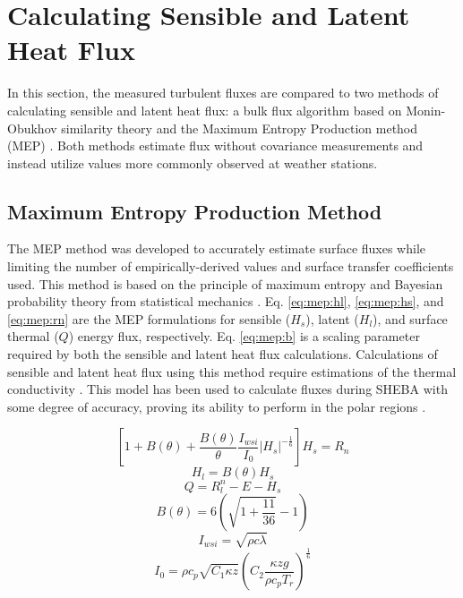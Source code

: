 \section{Calculating Sensible and Latent Heat Flux}
In this section, the measured turbulent fluxes are compared to two methods of calculating sensible and latent heat flux: a bulk flux algorithm based on Monin-Obukhov similarity theory \citep{foken:2008} and the Maximum Entropy Production method (MEP) \citep{zhang:2021, wang:2014, wang:2009}. Both methods estimate flux without covariance measurements and instead utilize values more commonly observed at weather stations.

\subsection{Maximum Entropy Production Method} 
The MEP method was developed to accurately estimate surface fluxes while limiting the number of empirically-derived values and surface transfer coefficients used. This method is based on the principle of maximum entropy and Bayesian probability theory from statistical mechanics \citep{dewar:2004, wang:2014}. Eq. \ref{eq:mep:hl}, \ref{eq:mep:hs}, and \ref{eq:mep:rn} are the MEP formulations for sensible ($H_{s}$), latent ($H_{l}$), and surface thermal ($Q$) energy flux, respectively. Eq. \ref{eq:mep:b} is a scaling parameter required by both the sensible and latent heat flux calculations. Calculations of sensible and latent heat flux using this method require estimations of the thermal conductivity \citep{wang:2014}. This model has been used to calculate fluxes during SHEBA with some degree of accuracy, proving its ability to perform in the polar regions \citep{wang:2014}.

\begin{equation}\label{eq:mep:rn}
\left[ 1 + B(\theta) + \frac{B(\theta)}{\theta} \frac{I_{wsi}}{I_{0}} | H_{s} | ^{-\frac{1}{6}} \right] H_{s} = R_{n}
\end{equation}
\begin{equation}\label{eq:mep:hl}
H_{l} = B(\theta) H_{s}
\end{equation}
\begin{equation}\label{eq:mep:hs}
Q = R_{l}^{n} - E - H_{s}
\end{equation}
\begin{equation}\label{eq:mep:b}
B(\theta) = 6 \left( \sqrt{1 + \frac{11}{36}} - 1 \right)
\end{equation}
\begin{equation}\label{eq:iwsi}
I_{wsi} = \sqrt{\rho c \lambda}
\end{equation}
\begin{equation}\label{eq:i0}
I_{0} = \rho c_{p} \sqrt{C_{1}\kappa z} \left( C_{2} \frac{\kappa zg}{\rho c_{p} T_{r}} \right)^{\frac{1}{6}}
\end{equation}

